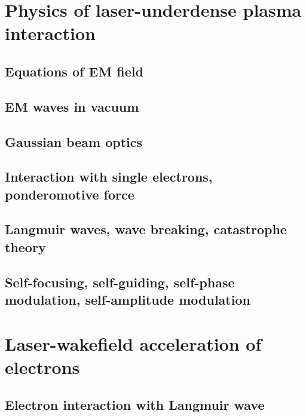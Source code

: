 \documentclass[10pt, twoside, a4paper, openright]{report}
\begin{document}

\chapter{Physics of laser-underdense plasma interaction}
%

\section{Equations of EM field}
%

\section{EM waves in vacuum}
%

\section{Gaussian beam optics}
%

\section{Interaction with single electrons, ponderomotive force}


\section{Langmuir waves, wave breaking, catastrophe theory}
%

\section{Self-focusing, self-guiding, self-phase modulation, self-amplitude modulation}
%


\chapter{Laser-wakefield acceleration of electrons}
%

\section{Electron interaction with Langmuir wave}

\end{document}
